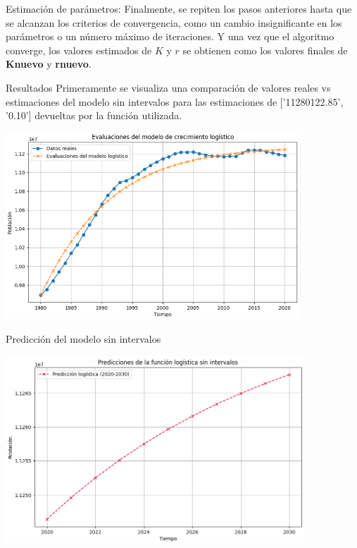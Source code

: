 \documentclass{beamer}
\begin{document}
\begin{frame}{Estimación de parámetros:}
    Finalmente, se repiten los pasos anteriores hasta que se alcanzan los criterios de convergencia, como un cambio insignificante en los parámetros o un número máximo de iteraciones. Y una vez que el algoritmo converge, los valores estimados de $K$ y $r$ se obtienen como los valores finales de \textbf{Knuevo} y \textbf{rnuevo}.
\end{frame}

\begin{frame}{Resultados}
    \small{Primeramente se visualiza una comparación de valores reales vs estimaciones del modelo sin intervalos para las estimaciones de ['11280122.85', '0.10'] devueltas por la función utilizada.}
    \begin{center}
    \includegraphics[height = 7cm]{img/real_vs_pred.png}
    \end{center}
\end{frame}

\begin{frame}{Predicción del modelo sin intervalos}
    \begin{center}
        \includegraphics[height = 7cm]{img/graph_sin_intervalos.png}
    \end{center}
\end{frame}
\end{document}
